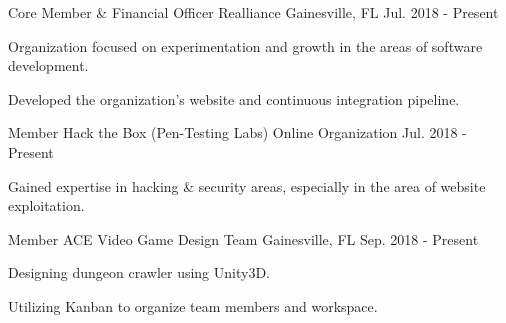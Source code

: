 \begin{cventries}
  \cventry
    {Core Member \& Financial Officer}
    {Realliance}
    {Gainesville, FL}
    {Jul. 2018 - Present}
    {
      \begin{cvitems}
        \item {Organization focused on experimentation and growth in the areas of software development.}
        \item {Developed the organization's website and continuous integration pipeline.}
      \end{cvitems}
    }
  \cventry
    {Member}
    {Hack the Box (Pen-Testing Labs)}
    {Online Organization}
    {Jul. 2018 - Present}
    {
      \begin{cvitems}
        \item {Gained expertise in hacking \& security areas, especially in the area of website exploitation.}
      \end{cvitems}
    }
  \cventry
    {Member}
    {ACE Video Game Design Team}
    {Gainesville, FL}
    {Sep. 2018 - Present}
    {
      \begin{cvitems}
        \item {Designing dungeon crawler using Unity3D.}
        \item {Utilizing Kanban to organize team members and workspace.}
      \end{cvitems}
    }
\end{cventries}
